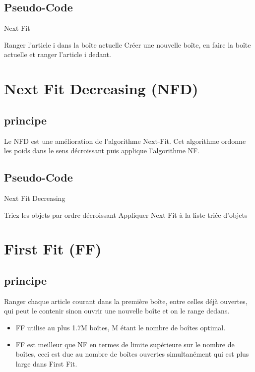 \documentclass[class=article, crop=false]{standalone}
\begin{document}
\subsection{Pseudo-Code}
\begin{algorithm}[H]
    \caption{Next Fit}
    \begin{algorithmic}
            \STATE Ranger l’article i dans la boîte actuelle
        \ELSE 
            \STATE Créer une nouvelle boîte, en faire la boîte actuelle et ranger l'article i dedant.
        \ENDIF
    \ENDFOR
    \end{algorithmic}
\end{algorithm}
\section{Next Fit Decreasing (NFD)}
\subsection{principe}
Le NFD est une amélioration de l’algorithme Next-Fit. Cet algorithme ordonne les poids dans le sens décroissant puis applique l’algorithme NF.

\subsection{Pseudo-Code}
\begin{algorithm}
    \caption{Next Fit Decreasing }
    \begin{algorithmic}
        \STATE Triez les objets par ordre décroissant
        \STATE Appliquer Next-Fit à la liste triée d'objets
    \end{algorithmic}
\end{algorithm}

\section{First Fit (FF)}
\subsection{principe}
Ranger chaque article courant dans la première boîte, entre celles déjà ouvertes, qui peut le contenir sinon ouvrir une nouvelle boîte et on le range dedans.
\begin{itemize}
    \item FF utilise au plus 1.7M boîtes, M étant le nombre de boîtes optimal. 
    \item FF est meilleur que NF en termes de limite supérieure sur le nombre de boîtes, ceci est due au nombre de boîtes ouvertes simultanément qui est plus large dans First Fit.
\end{itemize}
\end{document}
